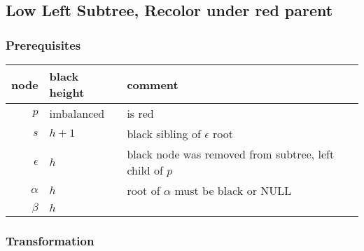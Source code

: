 \documentclass[a4paper,10pt,twoside]{article}
\begin{document}
\newpage
\subsection{Low Left Subtree, Recolor under red parent}

\subsubsection{Prerequisites}

\begin{center}
\begin{tabular}{|r||l|l|}
\hline
node		&	black height	&	comment	\\
\hline
\hline
$p$		&	imbalanced	&	is red	\\\hline
$s$		&	$h+1$	&	black sibling of $\epsilon$ root	\\\hline
$\epsilon$	&	$h$	&	black node was removed from subtree, left child of $p$	\\\hline
$\alpha$	&	$h$	&	root of $\alpha$ must be black or NULL	\\\hline
$\beta$		&	$h$	&		\\\hline
\end{tabular}
\end{center}

\begin{center}
\end{center}

\subsubsection{Transformation}
\end{document}
